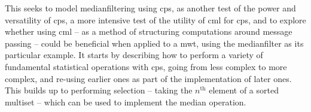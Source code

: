 
This  seeks to model \gls{medianfilter}ing using \gls{cps}, as another test of the power and versatility of \gls{cps}, a more intensive test of the utility of \gls{cml} for \gls{cps}, and to explore whether using \gls{cml} -- as a method of structuring computations around message passing -- could be beneficial when applied to a \gls{mwt}, using the \gls{medianfilter} as its particular example.  It starts by describing how to perform a variety of fundamental statistical operations with \gls{cps}, going from less complex to more complex, and re-using earlier ones as part of the implementation of later ones.  This builds up to performing selection -- taking the \(n^{\text{th}}\) element of a sorted multiset -- which can be used to implement the median operation.

